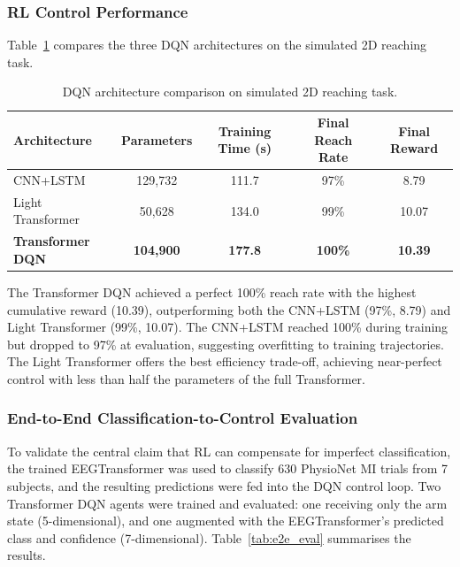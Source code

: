 \documentclass[12pt, a4paper]{article}
\begin{document}
\subsubsection{RL Control Performance}

Table~\ref{tab:dqn_comparison} compares the three DQN architectures on the simulated 2D reaching task.

\begin{table}[htbp]
\centering
\caption{DQN architecture comparison on simulated 2D reaching task.}
\label{tab:dqn_comparison}
\begin{tabular}{lcccc}
\toprule
\textbf{Architecture} & \textbf{Parameters} & \textbf{Training Time (s)} & \textbf{Final Reach Rate} & \textbf{Final Reward} \\
\midrule
CNN+LSTM          & 129,732  & 111.7  & 97\%  & 8.79 \\
Light Transformer & 50,628   & 134.0  & 99\%  & 10.07 \\
\textbf{Transformer DQN} & \textbf{104,900} & \textbf{177.8} & \textbf{100\%} & \textbf{10.39} \\
\bottomrule
\end{tabular}
\end{table}

The Transformer DQN achieved a perfect 100\% reach rate with the highest cumulative reward (10.39), outperforming both the CNN+LSTM (97\%, 8.79) and Light Transformer (99\%, 10.07). The CNN+LSTM reached 100\% during training but dropped to 97\% at evaluation, suggesting overfitting to training trajectories. The Light Transformer offers the best efficiency trade-off, achieving near-perfect control with less than half the parameters of the full Transformer.

\subsubsection{End-to-End Classification-to-Control Evaluation}
\label{sec:e2e_results}

To validate the central claim that RL can compensate for imperfect classification, the trained EEGTransformer was used to classify 630 PhysioNet MI trials from 7 subjects, and the resulting predictions were fed into the DQN control loop. Two Transformer DQN agents were trained and evaluated: one receiving only the arm state (5-dimensional), and one augmented with the EEGTransformer's predicted class and confidence (7-dimensional). Table~\ref{tab:e2e_eval} summarises the results.
\end{document}
